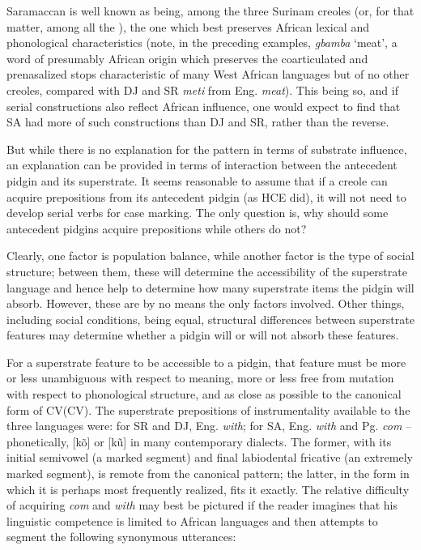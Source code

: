 Saramaccan is well known as being, among the three Surinam creoles (or, for that matter, among all the ), the one which best preserves African lexical and phonological characteristics
(note, in the preceding examples, \textit{gbamba} `meat', a word of presumably African origin which preserves the coarticulated and prenasalized stops characteristic of many West African languages but of no other creoles, compared with DJ and SR \textit{meti} from Eng. \textit{meat}). This being so, and if serial constructions also reflect African influence, one would expect to find that SA had more of such constructions than DJ and SR, rather than the reverse.

But while there is no explanation for the pattern in terms of substrate influence, an explanation can be provided in terms of interaction between the antecedent pidgin and its superstrate. It seems reasonable to assume that if a creole can acquire prepositions from its antecedent pidgin (as HCE did), it will not need to develop serial verbs for case marking. The only question is, why should some antecedent pidgins acquire prepositions while others do not?

Clearly, one factor is population balance, while another factor is the type of social structure; between them, these will determine the accessibility of the superstrate language and hence help to deter\-mine how many superstrate items the pidgin will absorb. However, these are by no means the only factors involved. Other things, including social conditions, being equal, structural differences between super\-strate features may determine whether a pidgin will or will not absorb these features.

For a superstrate feature to be accessible to a pidgin, that feature must be more or less unambiguous with respect to meaning, more or less free from mutation with respect to phonological structure, and as close as possible to the canonical form of CV(CV). The superstrate prepositions of instrumentality available to the three languages were: for SR and DJ, Eng. \textit{with}; for SA, Eng. \textit{with} and Pg. \textit{com} -- phonetically, [k\~o] or [k\~u] in many contemporary dialects. The former, with its initial semivowel (a marked segment) and final labiodental fricative (an extremely marked segment), is remote from the canonical pattern; the latter, in the form in which it is perhaps most frequently realized, fits it exactly. The relative difficulty of acquiring \textit{com} and \textit{with} may best be pictured if the reader imagines that his linguistic competence
is limited to African languages and then attempts to segment the following synonymous utterances:

